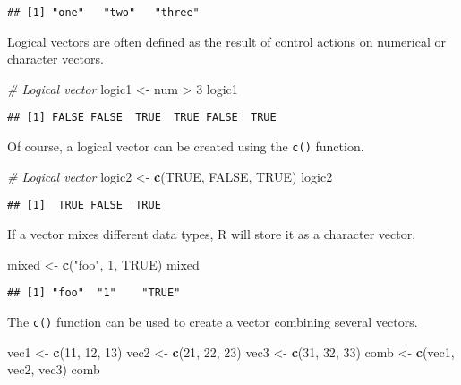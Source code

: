 \documentclass[]{book}
\newenvironment{Shaded}{\begin{snugshade}}{\end{snugshade}}
\newcommand{\KeywordTok}[1]{\textcolor[rgb]{0.13,0.29,0.53}{\textbf{{#1}}}}
\newcommand{\DecValTok}[1]{\textcolor[rgb]{0.00,0.00,0.81}{{#1}}}
\newcommand{\StringTok}[1]{\textcolor[rgb]{0.31,0.60,0.02}{{#1}}}
\newcommand{\CommentTok}[1]{\textcolor[rgb]{0.56,0.35,0.01}{\textit{{#1}}}}
\newcommand{\OtherTok}[1]{\textcolor[rgb]{0.56,0.35,0.01}{{#1}}}
\newcommand{\NormalTok}[1]{{#1}}
\begin{document}
\begin{verbatim}
## [1] "one"   "two"   "three"
\end{verbatim}

Logical vectors are often defined as the result of control actions on
numerical or character vectors.

\begin{Shaded}
\begin{Highlighting}[]
\CommentTok{# Logical vector}
\NormalTok{logic1 <-}\StringTok{ }\NormalTok{num >}\StringTok{ }\DecValTok{3}
\NormalTok{logic1}
\end{Highlighting}
\end{Shaded}

\begin{verbatim}
## [1] FALSE FALSE  TRUE  TRUE FALSE  TRUE
\end{verbatim}

Of course, a logical vector can be created using the \texttt{c()}
function.

\begin{Shaded}
\begin{Highlighting}[]
\CommentTok{# Logical vector}
\NormalTok{logic2 <-}\StringTok{ }\KeywordTok{c}\NormalTok{(}\OtherTok{TRUE}\NormalTok{, }\OtherTok{FALSE}\NormalTok{, }\OtherTok{TRUE}\NormalTok{)}
\NormalTok{logic2}
\end{Highlighting}
\end{Shaded}

\begin{verbatim}
## [1]  TRUE FALSE  TRUE
\end{verbatim}

If a vector mixes different data types, R will store it as a character
vector.

\begin{Shaded}
\begin{Highlighting}[]
\NormalTok{mixed <-}\StringTok{ }\KeywordTok{c}\NormalTok{(}\StringTok{"foo"}\NormalTok{, }\DecValTok{1}\NormalTok{, }\OtherTok{TRUE}\NormalTok{)}
\NormalTok{mixed}
\end{Highlighting}
\end{Shaded}

\begin{verbatim}
## [1] "foo"  "1"    "TRUE"
\end{verbatim}

The \texttt{c()} function can be used to create a vector combining
several vectors.

\begin{Shaded}
\begin{Highlighting}[]
\NormalTok{vec1 <-}\StringTok{ }\KeywordTok{c}\NormalTok{(}\DecValTok{11}\NormalTok{, }\DecValTok{12}\NormalTok{, }\DecValTok{13}\NormalTok{)}
\NormalTok{vec2 <-}\StringTok{ }\KeywordTok{c}\NormalTok{(}\DecValTok{21}\NormalTok{, }\DecValTok{22}\NormalTok{, }\DecValTok{23}\NormalTok{)}
\NormalTok{vec3 <-}\StringTok{ }\KeywordTok{c}\NormalTok{(}\DecValTok{31}\NormalTok{, }\DecValTok{32}\NormalTok{, }\DecValTok{33}\NormalTok{)}
\NormalTok{comb <-}\StringTok{ }\KeywordTok{c}\NormalTok{(vec1, vec2, vec3)}
\NormalTok{comb}
\end{Highlighting}
\end{Shaded}
\end{document}
